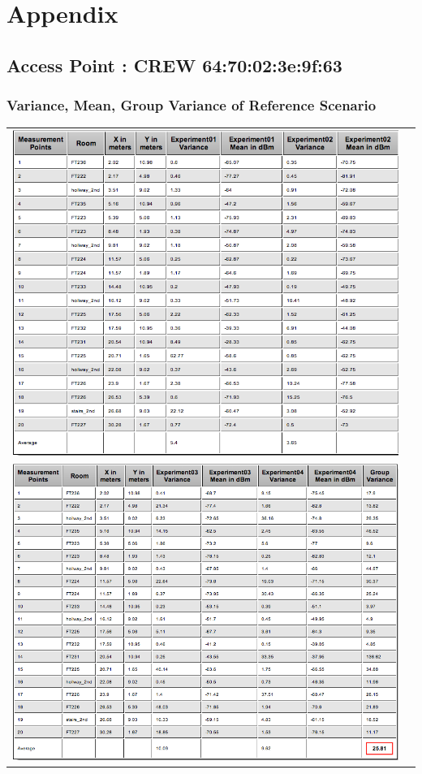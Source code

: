 \documentclass[11pt,a4paper,headinclude,footinclude,chapterprefix=on]{scrreprt}
\begin{document}
\chapter{Appendix} 
\section{Access Point : CREW 64:70:02:3e:9f:63} 
\subsection{Variance, Mean, Group Variance of Reference Scenario} 
\begin{longtable}
	{lr} 
	\includegraphics[width=15cm]{../../Source/plot/data/63_ref1.png} \\
	\includegraphics[width=15cm]{../../Source/plot/data/63_ref2.png} \\
\end{longtable}
\end{document}
